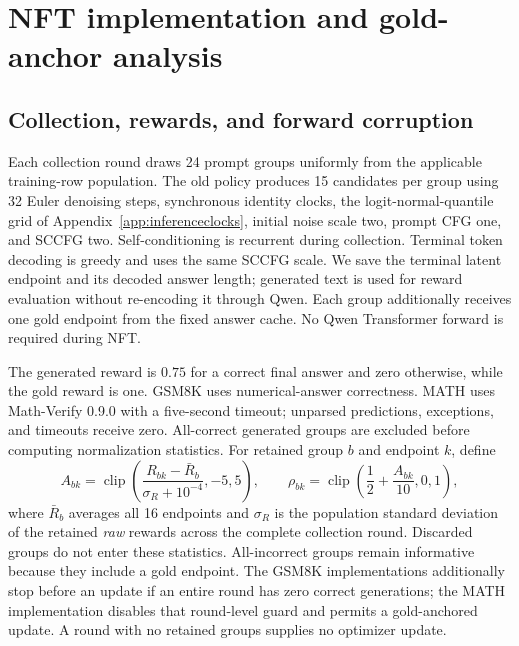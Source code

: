 \section{NFT implementation and gold-anchor analysis}
\label{app:nftdetails}

\subsection{Collection, rewards, and forward corruption}

Each collection round draws 24 prompt groups uniformly from the applicable training-row population. The old policy produces 15 candidates per group using 32 Euler denoising steps, synchronous identity clocks, the logit-normal-quantile grid of Appendix~\ref{app:inferenceclocks}, initial noise scale two, prompt CFG one, and SCCFG two. Self-conditioning is recurrent during collection. Terminal token decoding is greedy and uses the same SCCFG scale. We save the terminal latent endpoint and its decoded answer length; generated text is used for reward evaluation without re-encoding it through Qwen. Each group additionally receives one gold endpoint from the fixed answer cache. No Qwen Transformer forward is required during NFT.

The generated reward is $0.75$ for a correct final answer and zero otherwise, while the gold reward is one. GSM8K uses numerical-answer correctness. MATH uses Math-Verify 0.9.0 with a five-second timeout; unparsed predictions, exceptions, and timeouts receive zero. All-correct generated groups are excluded before computing normalization statistics. For retained group $b$ and endpoint $k$, define
\begin{equation}
 A_{bk}=\operatorname{clip}\!\left(
 \frac{R_{bk}-\bar R_b}{\sigma_R+10^{-4}},-5,5\right),
 \qquad
 \rho_{bk}=\operatorname{clip}\!\left(\frac12+\frac{A_{bk}}{10},0,1\right),
 \label{eq:nftrewardnormalization}
\end{equation}
where $\bar R_b$ averages all 16 endpoints and $\sigma_R$ is the population standard deviation of the retained \emph{raw} rewards across the complete collection round. Discarded groups do not enter these statistics. All-incorrect groups remain informative because they include a gold endpoint. The GSM8K implementations additionally stop before an update if an entire round has zero correct generations; the MATH implementation disables that round-level guard and permits a gold-anchored update. A round with no retained groups supplies no optimizer update.

